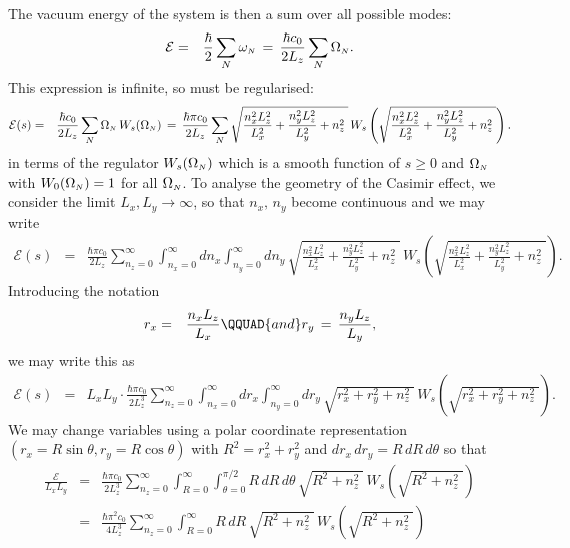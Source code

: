 \documentclass[sections]{tjwNOTES}
\newcommand\man[1]{\mathcal{#1}}
\newcommand\rx{r_{x}}
\newcommand\ry{r_{y}}
\newcommand\nx{n_{x}}
\newcommand\ny{n_{y}}
\newcommand\nz{n_{z}}
\newcommand\Lx{L_{x}}
\newcommand\Ly{L_{y}}
\newcommand\Lz{L_{z}}
\newcommand\N{\mbox{\tiny $N$}}
\newcommand\qquadand{\QQUAD{and}}
\begin{document}
The vacuum energy of the system is then a sum over all possible modes:
\begin{eqnarray*}
    \man{E} &=& \frac{\hbar}{2} \sum_{N} \omega_{\N} \,=\, \frac{\hbar c_{0}}{2\Lz} \sum_{N} \Omega_{\N}.
\end{eqnarray*}
This expression is infinite, so must be regularised:
\begin{eqnarray*}
    \man{E}(s) &=& \frac{\hbar c_{0}}{2\Lz} \sum_{N} \Omega_{\N}\,W_{s}(\Omega_{\N}) \,=\, \frac{\hbar \pi c_{0}}{2\Lz} \sum_{N} \sqrt{ \frac{\nx^{2}\Lz^{2}}{\Lx^{2}} + \frac{\ny^{2}\Lz^{2}}{\Ly^{2}} + \nz^{2} \;}\,W_{s}\left(\sqrt{ \frac{\nx^{2}\Lz^{2}}{\Lx^{2}} + \frac{\ny^{2}\Lz^{2}}{\Ly^{2}} + \nz^{2} \;}\right) .
\end{eqnarray*}
in terms of the regulator $W_{s}(\Omega_{\N})$ which is a smooth function of $s\geq0$ and $\Omega_{\N}$ with $W_{0}(\Omega_{\N})=1$ for all $\Omega_{\N}$. To analyse the geometry of the Casimir effect, we consider the limit $\Lx,\Ly\rightarrow \infty$, so that $\nx, \,\ny$ become continuous and we may write
\begin{eqnarray*}
    \man{E}(s) &=& \frac{\hbar \pi c_{0}}{2\Lz} \sum_{\nz=0}^{\infty} \int_{\nx=0}^{\infty}d\nx\int_{\ny=0}^{\infty}d\ny \, \sqrt{ \frac{\nx^{2}\Lz^{2}}{\Lx^{2}} + \frac{\ny^{2}\Lz^{2}}{\Ly^{2}} + \nz^{2} \;}\,W_{s}\left(\sqrt{ \frac{\nx^{2}\Lz^{2}}{\Lx^{2}} + \frac{\ny^{2}\Lz^{2}}{\Ly^{2}} + \nz^{2} \;}\right).
\end{eqnarray*}
Introducing the notation
\begin{eqnarray}\label{rnot}
    \rx &=& \frac{\nx\Lz}{\Lx} \qquadand \ry \,=\, \frac{\ny\Lz}{\Ly},
\end{eqnarray}
we may write this as
\begin{eqnarray*}
    \man{E}(s) &=& \Lx\Ly \cdot \frac{\hbar \pi c_{0}}{2\Lz^{3}} \sum_{\nz=0}^{\infty} \int_{\nx=0}^{\infty}d\rx\int_{\ny=0}^{\infty}d\ry \, \sqrt{ \rx^{2} + \ry^{2} + \nz^{2} \;}\,W_{s}\left(\sqrt{ \rx^{2} + \ry^{2} + \nz^{2} \;}\right).
\end{eqnarray*}
We may change variables using a polar coordinate representation $(\rx=R\sin\theta, \ry=R\cos\theta)$ with $R^{2}=\rx^{2}+\ry^{2}$ and $d\rx\,d\ry = R\,dR\,d\theta$ so that
\begin{eqnarray*}
    \frac{\man{E}}{\Lx\Ly} &=& \frac{\hbar \pi c_{0}}{2\Lz^{3}} \sum_{\nz=0}^{\infty} \int_{R=0}^{\infty}\int_{\theta=0}^{\pi/2} R\,dR\,d\theta \, \sqrt{ R^{2} + \nz^{2}\;}\, W_{s}\left(\sqrt{R^{2}+\nz^{2}\;}\right) \\
    &=& \frac{\hbar \pi^{2} c_{0}}{4\Lz^{3}} \sum_{\nz=0}^{\infty} \int_{R=0}^{\infty} R\,dR \, \sqrt{ R^{2} + \nz^{2}\;}\, W_{s}\left(\sqrt{R^{2}+\nz^{2}\;}\right)
\end{eqnarray*}
\end{document}
